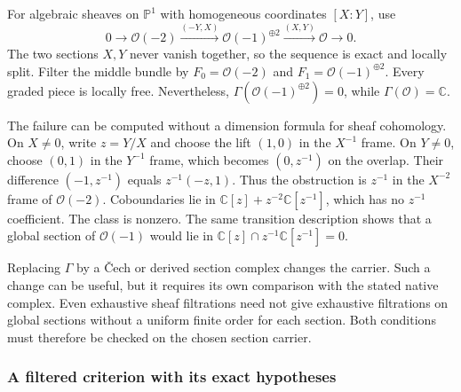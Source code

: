 \begin{example}\label{ex:fl19-global-sections}
For algebraic sheaves on $\mathbb P^1$ with homogeneous coordinates $[X:Y]$, use
\[
0\longrightarrow\mathcal O(-2)
\xrightarrow{(-Y,X)}\mathcal O(-1)^{\oplus2}
\xrightarrow{(X,Y)}\mathcal O\longrightarrow0.
\]
The two sections $X,Y$ never vanish together, so the sequence is exact and locally split.
Filter the middle bundle by $F_0=\mathcal O(-2)$ and $F_1=\mathcal O(-1)^{\oplus2}$.
Every graded piece is locally free.
Nevertheless, $\Gamma(\mathcal O(-1)^{\oplus2})=0$, while $\Gamma(\mathcal O)=\mathbb C$.

The failure can be computed without a dimension formula for sheaf cohomology.
On $X\ne0$, write $z=Y/X$ and choose the lift $(1,0)$ in the $X^{-1}$ frame.
On $Y\ne0$, choose $(0,1)$ in the $Y^{-1}$ frame, which becomes $(0,z^{-1})$ on the overlap.
Their difference $(-1,z^{-1})$ equals $z^{-1}(-z,1)$.
Thus the obstruction is $z^{-1}$ in the $X^{-2}$ frame of $\mathcal O(-2)$.
Coboundaries lie in
$\mathbb C[z]+z^{-2}\mathbb C[z^{-1}]$, which has no $z^{-1}$ coefficient.
The class is nonzero.
The same transition description shows that a global section of $\mathcal O(-1)$ would lie in
$\mathbb C[z]\cap z^{-1}\mathbb C[z^{-1}]=0$.
\end{example}

Replacing $\Gamma$ by a \v Cech or derived section complex changes the carrier.
Such a change can be useful, but it requires its own comparison with the stated native complex.
Even exhaustive sheaf filtrations need not give exhaustive filtrations on global sections without a uniform finite order for each section.
Both conditions must therefore be checked on the chosen section carrier.

\subsubsection{A filtered criterion with its exact hypotheses}

